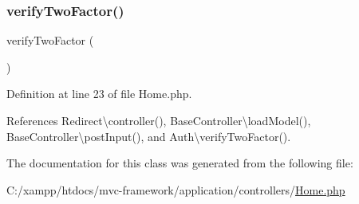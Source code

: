 \subsubsection{\texorpdfstring{verify\+Two\+Factor()}{verifyTwoFactor()}}
{\footnotesize\ttfamily verify\+Two\+Factor (\begin{DoxyParamCaption}{ }\end{DoxyParamCaption})}



Definition at line 23 of file Home.\+php.



References Redirect\textbackslash{}controller(), Base\+Controller\textbackslash{}load\+Model(), Base\+Controller\textbackslash{}post\+Input(), and Auth\textbackslash{}verify\+Two\+Factor().




The documentation for this class was generated from the following file\+:\begin{DoxyCompactItemize}
\item 
C\+:/xampp/htdocs/mvc-\/framework/application/controllers/\hyperlink{controllers_2_home_8php}{Home.\+php}\end{DoxyCompactItemize}
